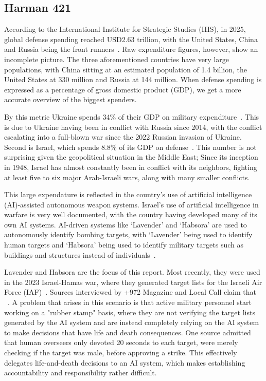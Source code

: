 \subsection{Harman 421} %

According to the International Institute for Strategic Studies (IIIS), in 2025, global defense spending reached USD2.63 trillion, with the United States, China and Russia being the front runners~\citep{iiss2026militarybalance}.
Raw expenditure figures, however, show an incomplete picture. The three aforementioned countries have very large populations, with China sitting at an estimated population of 1.4 billion, the United States at 330 million and Russia at 144 million. When defense spending is expressed as a percentage of gross domestic product (GDP), we get a more accurate overview of the biggest spenders.

By this metric Ukraine spends 34\% of their GDP on military expenditure~\citep{sipri2025milex}. This is due to Ukraine having been in conflict with Russia since 2014, with the conflict escalating into a full-blown war since the 2022 Russian invasion of Ukraine. Second is Israel, which spends 8.8\% of its GDP on defense~\citep{sipri2025milex}. This number is not surprising given the geopolitical situation in the Middle East; Since its inception in 1948, Israel has almost constantly been in conflict with its neighbors, fighting at least five to six major Arab-Israeli wars, along with many smaller conflicts.

This large expendature is reflected in the country's use of artificial intelligence (AI)-assisted autonomous weapon systems. Israel's use of artificial intelligence in warfare is very well documented, with the country having developed many of its own AI systems. AI-driven systems like `Lavender' and `Habsora' are used to autonomously identify bombing targets, with `Lavender' being used to identify human targets and `Habsora' being used to identify military targets such as buildings and structures instead of individuals~\citep{abraham2024lavender}.

Lavender and Habsora are the focus of this report. Most recently, they were used in the 2023 Israel-Hamas war, where they generated target lists for the Israeli Air Force (IAF)~\citep{abraham2024lavender}. Sources interviewed by +972 Magazine and Local Call claim that ~\citep{abraham2024lavender}. A problem that arises in this scenario is that active military personnel start working on a "rubber stamp" basis, where they are not verifying the target lists generated by the AI system and are instead completely relying on the AI system to make decisions that have life and death consequences. One source admitted that human overseers only devoted 20 seconds to each target, were merely checking if the target was male, before approving a strike. This effectively delegates life-and-death decisions to an AI system, which makes establishing accountability and responsibility rather difficult.